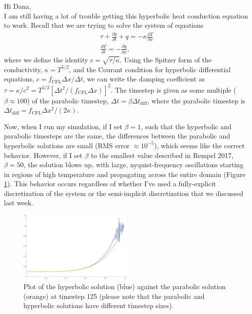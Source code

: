 \documentclass[10pt,letterpaper]{article}
\author{Roy Smart}
\begin{document}
	
	\noindent Hi Dana, \\
	
	I am still having a lot of trouble getting this hyperbolic heat conduction equation to work. Recall that we are trying to solve the system of equations
	\begin{gather}
		\tau + \frac{\partial q}{\partial t} + q = - \kappa \frac{\partial T}{\partial x} \\
		\frac{\partial T}{\partial t} = - \frac{\partial q}{\partial x},
	\end{gather}
	where we define the identity $c = \sqrt{\tau / \kappa}$. Using the Spitzer form of the conductivity, $\kappa = T^{5/2}$, and the Courant condition for hyperbolic differential equations, $c = f_{\text{CFL}} \Delta x / \Delta t$, we can write the damping coefficient as $\tau = \kappa / c^2 = T^{5/2}  [\Delta t^2 / (f_{\text{CFL}} \Delta x)]^2$. The timestep is given as some multiple ($\beta \approx 100$) of the parabolic timestep, $\Delta t = \beta \Delta t_{\text{diff}}$, where the parabolic timestep is $\Delta t_{\text{diff}} = f_{\text{CFL}} \Delta x^2 / (2 \kappa)$.
	
	Now, when I run my simulation, if I set $\beta = 1$, such that the hyperbolic and parabolic timesteps are the same, the differences between the parabolic and hyperbolic solutions are small (RMS error $\approx 10^{-5}$), which seems like the correct behavior. However, if I set $\beta$ to the smallest value described in Rempel 2017, $\beta=50$, the solution blows up, with large, nyquist-frequency oscillations starting in regions of high temperature and propagating across the entire domain (Figure \ref{b50}). This behavior occurs regardless of whether I've used a fully-explicit discretization of the system or the semi-implicit discretization that we discussed last week.	
	\begin{figure}[h]
		\centering
		\includegraphics[width=0.5\textwidth]{b50_t125}
		\caption{Plot of the hyperbolic solution (blue) against the parabolic solution (orange) at timestep 125 (please note that the parabolic and hyperbolic solutions have different timestep sizes).}
		\label{b50}
	\end{figure}
	
\end{document}
